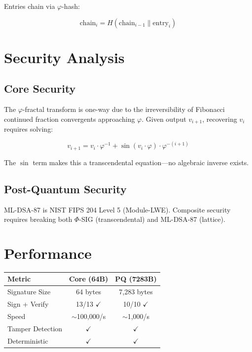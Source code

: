 \documentclass{article}
\begin{document}
Entries chain via $\varphi$-hash:

\begin{equation}
\text{chain}_i = H(\text{chain}_{i-1} \parallel \text{entry}_i)
\end{equation}

\section{Security Analysis}

\subsection{Core Security}

The $\varphi$-fractal transform is one-way due to the irreversibility of Fibonacci continued fraction convergents approaching $\varphi$. Given output $v_{i+1}$, recovering $v_i$ requires solving:

\begin{equation}
v_{i+1} = v_i \cdot \varphi^{-1} + \sin(v_i \cdot \varphi) \cdot \varphi^{-(i+1)}
\end{equation}

The $\sin$ term makes this a transcendental equation—no algebraic inverse exists.

\subsection{Post-Quantum Security}

ML-DSA-87 is NIST FIPS 204 Level 5 (Module-LWE). Composite security requires breaking both $\Phi$-SIG (transcendental) and ML-DSA-87 (lattice).

\section{Performance}

\begin{center}
\begin{tabular}{|l|c|c|}
\hline
\textbf{Metric} & \textbf{Core (64B)} & \textbf{PQ (7283B)} \\
\hline
Signature Size & 64 bytes & 7,283 bytes \\
Sign + Verify & 13/13 $\checkmark$ & 10/10 $\checkmark$ \\
Speed & $\sim$100,000/s & $\sim$1,000/s \\
Tamper Detection & $\checkmark$ & $\checkmark$ \\
Deterministic & $\checkmark$ & $\checkmark$ \\
\hline
\end{tabular}
\end{center}
\end{document}
